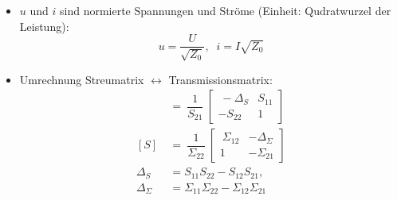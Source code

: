 \begin{itemize}
\begin{align*}
        &=\
        \begin{bmatrix}\
            \Sigma_{11} & \Sigma_{12}\\
            \Sigma_{21} & \Sigma_{22}\
        \end{bmatrix}\
        \begin{bmatrix}\
            a_2\\
            b_2\
        \end{bmatrix}\\
        \parbox{2cm}{ABCD-Matrix:}
        \begin{bmatrix}\
            u_1\\
            i_1\
        \end{bmatrix}\
        &=\
        \begin{bmatrix}\
            A & B\\
            C & D\
        \end{bmatrix}\
        \begin{bmatrix}\
            u_2\\
            -i_2\
        \end{bmatrix}\\
    \end{align*}
    \item $u$ und $i$ sind normierte Spannungen und Ströme (Einheit: Qudratwurzel der Leistung):
    \begin{equation*}
        u = \dfrac{U}{\sqrt{Z_0}},\;\; i = I \sqrt{Z_0}
    \end{equation*}
    \item Umrechnung Streumatrix $\leftrightarrow$ Transmissionsmatrix:
        \begin{align*}
            [\Sigma]\
            &=\
            \dfrac{1}{S_{21}}\
            \begin{bmatrix}\
                    -\Delta_S & S_{11}\\
                    -S_{22} & 1\
            \end{bmatrix}\\
            [S]\
            &=\
             \dfrac{1}{\Sigma_{22}}\
            \begin{bmatrix}\
                    \Sigma_{12} & -\Delta_\Sigma\\
                    1 & -\Sigma_{21}
            \end{bmatrix}\\
            \Delta_S &= S_{11}S_{22} - S_{12}S_{21},\\
            \Delta_\Sigma &= \Sigma_{11}\Sigma_{22} - \Sigma_{12}\Sigma_{21}

\end{align*}
\end{itemize}
